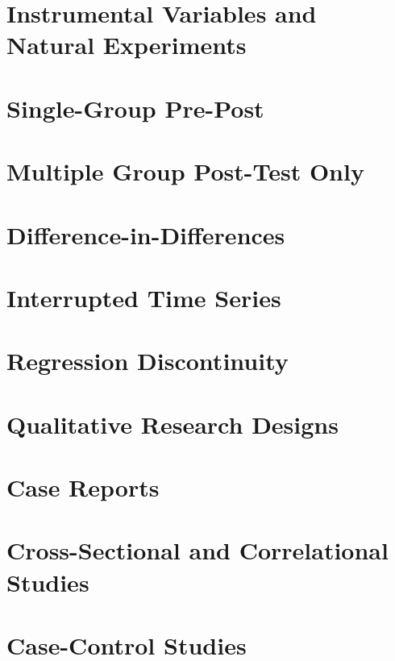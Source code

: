 \documentclass[justified,twoside,symmetric,]{tufte-book}
\begin{document}
\hypertarget{ivnatural}{%
\chapter{Instrumental Variables and Natural Experiments}\label{ivnatural}}

\hypertarget{prepost}{%
\chapter{Single-Group Pre-Post}\label{prepost}}

\hypertarget{postpost}{%
\chapter{Multiple Group Post-Test Only}\label{postpost}}

\hypertarget{did}{%
\chapter{Difference-in-Differences}\label{did}}

\hypertarget{its}{%
\chapter{Interrupted Time Series}\label{its}}

\hypertarget{rd}{%
\chapter{Regression Discontinuity}\label{rd}}

\hypertarget{qualdesigns}{%
\chapter{Qualitative Research Designs}\label{qualdesigns}}

\hypertarget{case}{%
\chapter{Case Reports}\label{case}}

\hypertarget{xsectional}{%
\chapter{Cross-Sectional and Correlational Studies}\label{xsectional}}

\hypertarget{casecontrol}{%
\chapter{Case-Control Studies}\label{casecontrol}}
\end{document}
